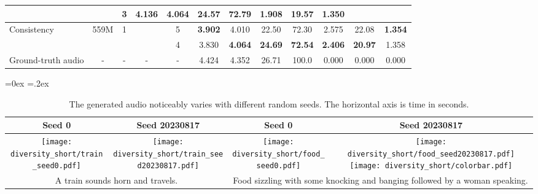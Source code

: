 \documentclass{article}
\newcommand{\cmark}{\ding{51}}
\newcommand{\xmark}{\ding{55}}
\begin{document}
\begin{table*}[!tb]
\begin{footnotesize}
\begin{tabular}{lccccccccccc}
    & \xmark            & 3     & 4.136             & 4.064         & 24.57
    & 72.79             & 1.908             & 19.57                 & 1.350 \\
    \midrule
    \multirow{2}{*}{Consistency}        & \multirow{2}{*}{559M}     & \multirow{2}{*}{1}
    & \xmark            & 5     & \textbf{3.902}    & 4.010         & 22.50
    & 72.30             & 2.575             & 22.08                 & \textbf{1.354} \\
    &   &   & \cmark    & 4     & 3.830     & \textbf{4.064}        & \textbf{24.69}
    & \textbf{72.54}    & \textbf{2.406}    & \textbf{20.97}        & 1.358 \\
    \midrule
    Ground-truth audio & - & - & - & - & 4.424 & 4.352         & 26.71
    & 100.0             & 0.000 & 0.000 & 0.000                     \\
    \bottomrule
\end{tabular}
\end{footnotesize}
\end{table*}

\begin{table*}[!ht]
\vspace{-2mm}
\centering
\aboverulesep=0ex \belowrulesep=.2ex
\caption{The generated audio noticeably varies with different random seeds. The horizontal axis is time in seconds.}
\vspace{.6mm}
\begin{footnotesize}
\begin{tabular}{cc|cc}
    \textbf{Seed 0} & \textbf{Seed 20230817} & \textbf{Seed 0} & \textbf{Seed 20230817} \\
    \toprule
    \hspace{-2mm} \texttt{[image: diversity\_short/train\_seed0.pdf]} \hspace{-2mm} &
    \hspace{-2mm} \texttt{[image: diversity\_short/train\_seed20230817.pdf]} &
    \hspace{-2mm} \texttt{[image: diversity\_short/food\_seed0.pdf]} \hspace{-2mm} &
    \hspace{-2mm} \texttt{[image: diversity\_short/food\_seed20230817.pdf]}
    \texttt{[image: diversity\_short/colorbar.pdf]} \hspace{-2mm} \\[.3mm]
    \multicolumn{2}{c|}{A train sounds horn and travels.} &
    \multicolumn{2}{c}{Food sizzling with some knocking and banging followed by a woman speaking.}
\end{tabular}
\end{footnotesize}
\vspace{-.7mm}
\label{tab:diversity}
\end{table*}
\end{document}
